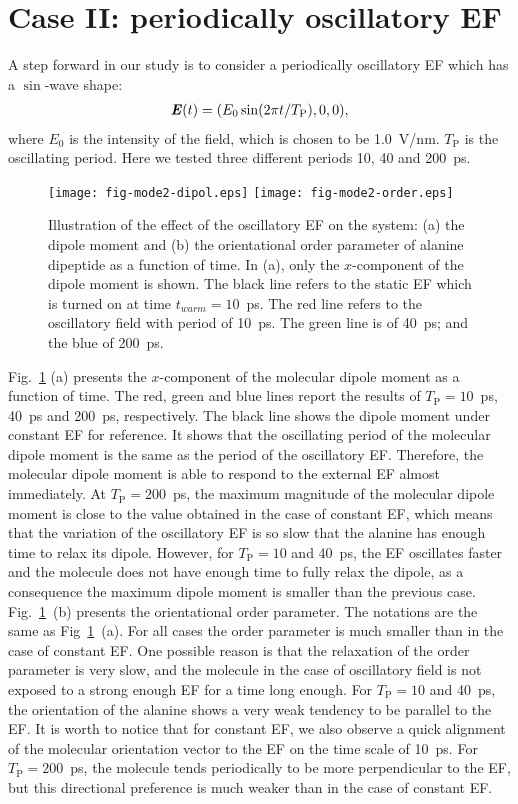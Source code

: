 \documentclass[journal=jctcce,manuscript=manuscript]{achemso}
\newcommand{\vect}[1]{\textbf{\textit{#1}}}
\newcommand{\period}[0]{T_{\textrm{P}}}
\begin{document}
\section{Case II:
  periodically oscillatory EF}
A step forward in our study is to consider a periodically oscillatory EF which has
a $\sin$-wave shape:
\begin{align}
  \vect E(t) = (E_0\sin(2\pi t / \period), 0, 0),
\end{align}
where $E_0$ is the intensity of the field, which is chosen to be
1.0~V/nm.  $\period$ is the oscillating period.
Here we tested three different
periods 10, 40 and 200~ps.
\begin{figure}
  \centering
  \texttt{[image: fig-mode2-dipol.eps]}
  \texttt{[image: fig-mode2-order.eps]}
  \caption{Illustration of the effect of the oscillatory EF on the system:
    (a) the dipole moment  and (b) the
    orientational order parameter of alanine dipeptide as a
    function of time. In (a),
    only the $x$-component of the dipole moment is
    shown. The black line refers to the static EF which is turned on
    at time $t_{warm} = 10$~ps. The red line refers to the oscillatory field with period of
    10~ps. The green line is of 40~ps; and the blue of 200~ps.}
  \label{fig:tmp8}
\end{figure}
Fig.~\ref{fig:tmp8} (a)
presents the $x$-component of the molecular dipole moment as
a function of time. The red, green and blue lines report the
results of $\period =10$~ps, 40~ps and 200~ps, respectively. The black line
shows the dipole moment under constant EF
for reference.
It shows that the oscillating period of the molecular dipole moment
is the same as the period of the oscillatory EF. Therefore,
the molecular dipole moment
is able to respond to the external EF almost immediately.
At $\period =200$~ps, the maximum magnitude of the molecular
dipole moment is close to the value obtained in the case of constant EF, which
means that the variation of the oscillatory EF is so slow that the
alanine has enough time to 
relax its dipole. However,
for $\period =10$ and 40~ps, the EF oscillates faster and the molecule 
does not have enough time to fully relax the dipole, as a consequence the maximum dipole moment is smaller than the previous case.
Fig.~\ref{fig:tmp8}~(b) presents the orientational order
parameter. The notations are the same as Fig~\ref{fig:tmp8}~(a).
For all cases the order parameter is much
smaller than in the case of constant EF. One possible reason is that the
relaxation of the order parameter is very slow, and the molecule in the case of oscillatory field is
not exposed to a strong enough EF for a time long enough.
For  $\period =10$ and 40~ps, the orientation of the alanine shows a {very} weak tendency
to be parallel to the EF. It is worth to notice that for constant EF,
we also observe a quick alignment of the molecular orientation vector to the EF
on the time scale of 10~ps. For $\period =200$~ps, the molecule tends periodically
to be more perpendicular to the EF, but this directional preference is much
weaker than in the case of constant EF.
\end{document}
